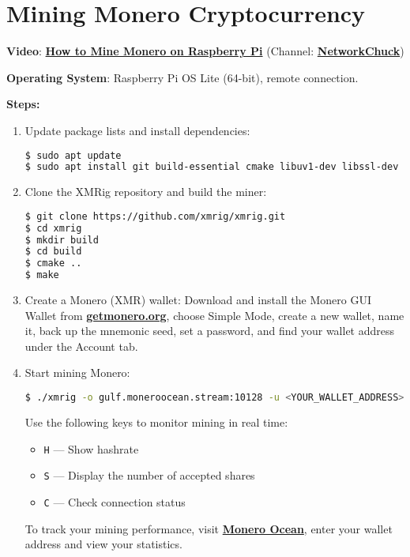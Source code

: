 \section{Mining Monero Cryptocurrency}

\noindent \textbf{Video}: \href{https://www.youtube.com/watch?v=hHtGN_JzoP8}{\textbf{\color{blue}How to Mine Monero on Raspberry Pi}} (Channel: \href{https://www.youtube.com/@NetworkChuck}{\textbf{\color{blue}NetworkChuck}})

\vspace{0.5cm}

\noindent \textbf{Operating System}: Raspberry Pi OS Lite (64-bit), remote connection.

\vspace{0.5cm}

\noindent \textbf{Steps:}
\begin{enumerate}
\item Update package lists and install dependencies:
\begin{lstlisting}[language=bash, breaklines=true, breakatwhitespace=true, columns=fullflexible]
$ sudo apt update
$ sudo apt install git build-essential cmake libuv1-dev libssl-dev libhwloc-dev -y
\end{lstlisting}

\item Clone the XMRig repository and build the miner:
\begin{lstlisting}[language=bash, breaklines=true, breakatwhitespace=true, columns=fullflexible]
$ git clone https://github.com/xmrig/xmrig.git
$ cd xmrig
$ mkdir build
$ cd build
$ cmake ..
$ make
\end{lstlisting}

\item Create a Monero (XMR) wallet: Download and install the Monero GUI Wallet from \href{https://www.getmonero.org}{\textbf{\color{blue}getmonero.org}}, choose Simple Mode, create a new wallet, name it, back up the mnemonic seed, set a password, and find your wallet address under the Account tab.

\item Start mining Monero:  
\begin{lstlisting}[language=bash, breaklines=true, breakatwhitespace=true, columns=fullflexible]
$ ./xmrig -o gulf.moneroocean.stream:10128 -u <YOUR_WALLET_ADDRESS> -p <WORKER_NAME>
\end{lstlisting}

Use the following keys to monitor mining in real time:  
\begin{itemize}
\item \texttt{H} — Show hashrate  
\item \texttt{S} — Display the number of accepted shares  
\item \texttt{C} — Check connection status  
\end{itemize}

To track your mining performance, visit \href{https://moneroocean.stream/}{\textbf{\color{blue}Monero Ocean}}, enter your wallet address and view your statistics.

\end{enumerate}

